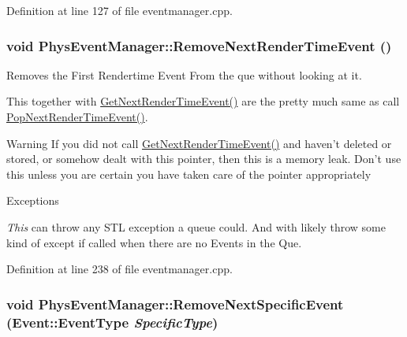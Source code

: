 Definition at line 127 of file eventmanager.cpp.

\hypertarget{classPhysEventManager_a56acc075e743921e27284c023b3298ce}{
\subsubsection[{RemoveNextRenderTimeEvent}]{\setlength{\rightskip}{0pt plus 5cm}void PhysEventManager::RemoveNextRenderTimeEvent ()}}
\label{d5/dd7/classPhysEventManager_a56acc075e743921e27284c023b3298ce}


Removes the First Rendertime Event From the que without looking at it. 

This together with \hyperlink{classPhysEventManager_ae1276d993b2892048341205ae0e8de02}{GetNextRenderTimeEvent()} are the pretty much same as call \hyperlink{classPhysEventManager_a682d25bedcbbf2c66bd8c067e67ee7f5}{PopNextRenderTimeEvent()}. \begin{DoxyWarning}{Warning}
If you did not call \hyperlink{classPhysEventManager_ae1276d993b2892048341205ae0e8de02}{GetNextRenderTimeEvent()} and haven't deleted or stored, or somehow dealt with this pointer, then this is a memory leak. Don't use this unless you are certain you have taken care of the pointer appropriately 
\end{DoxyWarning}

\begin{DoxyExceptions}{Exceptions}
\item[{\em This}]can throw any STL exception a queue could. And with likely throw some kind of except if called when there are no Events in the Que. \end{DoxyExceptions}


Definition at line 238 of file eventmanager.cpp.

\hypertarget{classPhysEventManager_a0984ae7ac0cc0db9fb24e50156497de4}{
\subsubsection[{RemoveNextSpecificEvent}]{\setlength{\rightskip}{0pt plus 5cm}void PhysEventManager::RemoveNextSpecificEvent ({\bf Event::EventType} {\em SpecificType})}}
\label{d5/dd7/classPhysEventManager_a0984ae7ac0cc0db9fb24e50156497de4}


